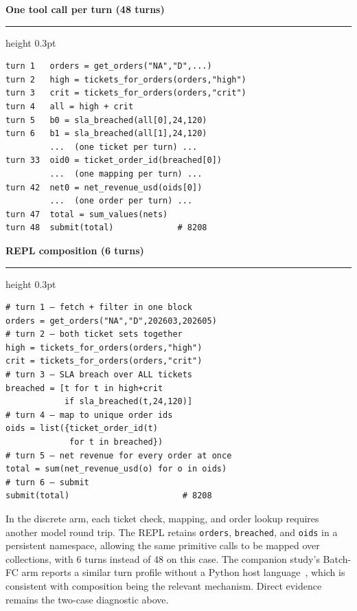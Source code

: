 \begin{tcolorbox}[arc=4pt,boxrule=0.4pt,colback=mindlabbg,colframe=mindlabline,left=5pt,right=5pt,top=4pt,bottom=4pt,before skip=6pt,after skip=6pt]
\footnotesize
\noindent\begin{minipage}[t]{0.47\textwidth}
{\bfseries\color{mindlabmuted} One tool call per turn (48 turns)}\par\vspace{2pt}\hrule height 0.3pt\vspace{3pt}
\begin{verbatim}
turn 1   orders = get_orders("NA","D",...)
turn 2   high = tickets_for_orders(orders,"high")
turn 3   crit = tickets_for_orders(orders,"crit")
turn 4   all = high + crit
turn 5   b0 = sla_breached(all[0],24,120)
turn 6   b1 = sla_breached(all[1],24,120)
         ...  (one ticket per turn) ...
turn 33  oid0 = ticket_order_id(breached[0])
         ...  (one mapping per turn) ...
turn 42  net0 = net_revenue_usd(oids[0])
         ...  (one order per turn) ...
turn 47  total = sum_values(nets)
turn 48  submit(total)             # 8208
\end{verbatim}
\end{minipage}\hfill
\begin{minipage}[t]{0.47\textwidth}
{\bfseries\color{mindlabblue} REPL composition (6 turns)}\par\vspace{2pt}\hrule height 0.3pt\vspace{3pt}
\begin{verbatim}
# turn 1 — fetch + filter in one block
orders = get_orders("NA","D",202603,202605)
# turn 2 — both ticket sets together
high = tickets_for_orders(orders,"high")
crit = tickets_for_orders(orders,"crit")
# turn 3 — SLA breach over ALL tickets
breached = [t for t in high+crit
            if sla_breached(t,24,120)]
# turn 4 — map to unique order ids
oids = list({ticket_order_id(t)
             for t in breached})
# turn 5 — net revenue for every order at once
total = sum(net_revenue_usd(o) for o in oids)
# turn 6 — submit
submit(total)                       # 8208
\end{verbatim}
\end{minipage}
\end{tcolorbox}

In the discrete arm, each ticket check, mapping, and order lookup requires another model round trip. The REPL retains \texttt{orders}, \texttt{breached}, and \texttt{oids} in a persistent namespace, allowing the same primitive calls to be mapped over collections, with 6 turns instead of 48 on this case. The companion study's Batch-FC arm reports a similar turn profile without a Python host language~\citep{wu2026replharnesses}, which is consistent with composition being the relevant mechanism. Direct \venti{} evidence remains the two-case diagnostic above.

